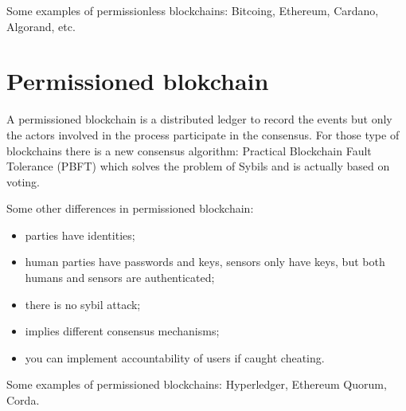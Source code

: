 Some examples of permissionless blockchains: Bitcoing, Ethereum, Cardano, Algorand, etc.

\section{Permissioned blokchain}
A permissioned blockchain is a distributed ledger to record the events but only the actors involved in the process participate in the consensus.
For those type of blockchains there is a new consensus algorithm: Practical Blockchain Fault Tolerance (PBFT) which solves the problem of Sybils and is actually based on voting.

Some other differences in permissioned blockchain:
\begin{itemize}
    \item parties have identities;
    \item human parties have passwords and keys, sensors only have keys, but both humans and sensors are authenticated;
    \item there is no sybil attack;
    \item implies different consensus mechanisms;
    \item you can implement accountability of users if caught cheating.
\end{itemize}

Some examples of permissioned blockchains: Hyperledger, Ethereum Quorum, Corda.
